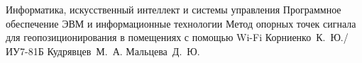 \documentclass{bmstu/bmstu}
\begin{document}
\makethesistitle
    {Информатика, искусственный интеллект и системы управления} %
    {Программное обеспечение ЭВМ и информационные технологии} %
    {Метод опорных точек сигнала для геопозиционирования в помещениях с помощью Wi-Fi} %
    {Корниенко~К.~Ю./ИУ7-81Б} %
    {Кудрявцев~М.~А.} %
    {} %
    {Мальцева~Д.~Ю.} %

\setcounter{page}{5}


\maketableofcontents











\makebibliography


\end{document}
